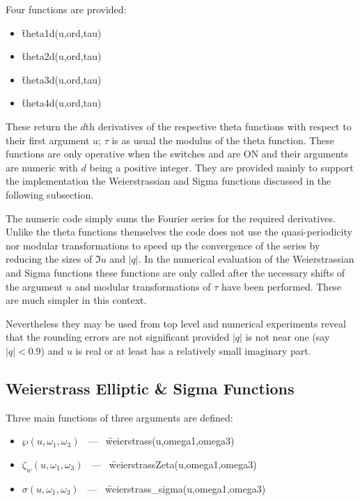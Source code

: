 \hypertarget{THETAD}{}
\hypertarget{operator:THETA1D}{}
\hypertarget{operator:THETA2D}{}
\hypertarget{operator:THETA3D}{}
\hypertarget{operator:THETA4D}{}
 
Four functions are provided:
\begin{itemize}
\item \f{theta1d(u,ord,tau)}
\item \f{theta2d(u,ord,tau)}
\item \f{theta3d(u,ord,tau)}
\item \f{theta4d(u,ord,tau)}
\end{itemize}
These return the $d$th derivatives of the respective theta functions
with respect to their first argument $u$; $\tau$ is as usual the modulus
of the theta function. These functions are only operative when the switches
 and  are ON and their arguments are numeric with
$d$ being a positive integer.  They are provided mainly to support the implementation
the Weierstrassian and Sigma functions discussed in the following subsection.

The numeric code simply sums the Fourier series for the required derivatives.
Unlike the theta functions themselves the code does not use the quasi-periodicity nor
modular transformations to speed  up the convergence of the series by reducing the sizes
of $\Im u$ and $|q|$.  In the numerical evaluation of the Weierstrassian and Sigma functions
these functions are only called after the necessary shifts of the argument $u$ and modular
transformations of $\tau$ have been performed. These are much simpler in this context.

Nevertheless they may be used from top level and numerical experiments reveal that the rounding
errors are not significant provided $|q|$ is not near one (say $|q|<0.9$)
and $u$ is real or at least has a relatively small imaginary part.

\subsection{Weierstrass Elliptic \& Sigma Functions}
Three main functions of three arguments are defined:
\hypertarget{WEIERSTRASS}{}
\hypertarget{WEIERSTRASSZETA}{}
\hypertarget{SIGMA}{}
\hypertarget{operator:WEIERSTRASS_SIGMA}{}
\hypertarget{operator:WEIERSTRASS}{}
\hypertarget{operator:WEIERSTRASSZETA}{}
 
\begin{itemize}
\item  $\wp(u, \omega_1, \omega_3)$ \ --- \ \f{weierstrass(u,omega1,omega3)}
\item $\zeta_w(u, \omega_1, \omega_3)$ \ --- \ \f{weierstrassZeta(u,omega1,omega3)}
\item $\sigma(u, \omega_1, \omega_3)$ \ --- \ \f{weierstrass\_sigma(u,omega1,omega3)}
\end{itemize}

